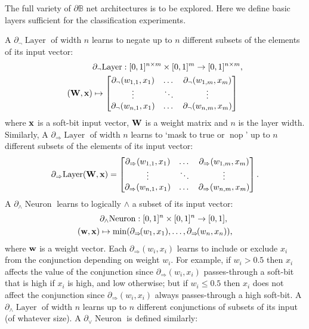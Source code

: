 \documentclass{article}
\theoremstyle{plain}
\theoremstyle{definition}
\theoremstyle{remark}
\begin{document}
The full variety of $\partial\mathbb{B}$ net architectures is to be explored. Here we define basic layers sufficient for the classification experiments.

A $\partial_{\neg} \!\operatorname{Layer}$ of width $n$ learns to negate up to $n$ different subsets of the elements of its input vector:
\begin{equation*}
\begin{aligned}
& \partial_{\neg} \!\operatorname{Layer}: [0,1]^{n \times m} \times [0,1]^{m} \to [0,1]^{n \times m}, \\
({\bf W}, {\bf x}) &\mapsto 
\begin{bmatrix}
\partial_{\neg}(w_{1,1}, x_{1}) & \dots & \partial_{\neg}(w_{1,m}, x_{m}) \\
\vdots & \ddots & \vdots \\
\partial_{\neg}(w_{n,1}, x_{1}) & \dots & \partial_{\neg}(w_{n,m}, x_{m})
\end{bmatrix}
\end{aligned}
\end{equation*}
where ${\bf x}$ is a soft-bit input vector, ${\bf W}$ is a weight matrix and $n$ is the layer width. Similarly, A $\partial_{\Rightarrow} \!\operatorname{Layer}$ of width $n$ learns to `mask to true or $\operatorname{nop}$' up to $n$ different subsets of the elements of its input vector:
\begin{equation*}
\partial_{\Rightarrow} \!\operatorname{Layer}({\bf W}, {\bf x}) =
\begin{bmatrix}
\partial_{\Rightarrow}(w_{1,1}, x_{1}) & \dots & \partial_{\Rightarrow}(w_{1,m}, x_{m}) \\
\vdots & \ddots & \vdots \\
\partial_{\Rightarrow}(w_{n,1}, x_{1}) & \dots & \partial_{\Rightarrow}(w_{n,m}, x_{m})
\end{bmatrix}\text{.}
\end{equation*}
A $\partial_{\wedge}\!\operatorname{Neuron}$ learns to logically $\wedge$ a subset of its input vector:
\begin{equation*}
\begin{aligned}
& \partial_{\wedge}\!\operatorname{Neuron}: [0,1]^{n} \times [0,1]^{n} \to [0,1], \\
({\bf w}, {\bf x}) & \mapsto \min(\partial_{\Rightarrow}\!(w_{1}, x_{1}), \dots, \partial_{\Rightarrow}\!(w_{n}, x_{n}))\text{,}
\end{aligned}
\end{equation*}
where ${\bf w}$ is a weight vector. Each $\partial_{\Rightarrow}(w_{i},x_{i})$ learns to include or exclude $x_{i}$ from the conjunction depending on weight $w_{i}$. For example, if $w_{i}>0.5$ then $x_{i}$ affects the value of the conjunction since $\partial_{\Rightarrow}(w_{i},x_{i})$ passes-through a soft-bit that is high if $x_{i}$ is high, and low otherwise; but if $w_{i} \leq 0.5$ then $x_{i}$ does not affect the conjunction since $\partial_{\Rightarrow}(w_{i},x_{i})$ always passes-through a high soft-bit. A $\partial_{\wedge}\!\operatorname{Layer}$ of width $n$ learns up to $n$ different conjunctions of subsets of its input (of whatever size). A $\partial_{\vee}\!\operatorname{Neuron}$ is defined similarly:
\end{document}
